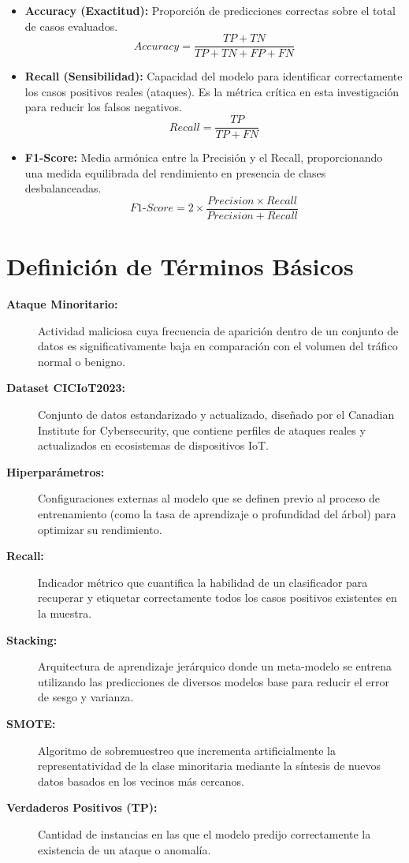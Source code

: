 \begin{itemize}
    \item \textbf{Accuracy (Exactitud):} Proporción de predicciones correctas sobre el total de casos evaluados.
    \begin{equation}
    Accuracy = \frac{TP + TN}{TP + TN + FP + FN}
    \end{equation}

    \item \textbf{Recall (Sensibilidad):} Capacidad del modelo para identificar correctamente los casos positivos reales (ataques). Es la métrica crítica en esta investigación para reducir los falsos negativos.
    \begin{equation}
    Recall = \frac{TP}{TP + FN}
    \end{equation}

    \item \textbf{F1-Score:} Media armónica entre la Precisión y el Recall, proporcionando una medida equilibrada del rendimiento en presencia de clases desbalanceadas.
    \begin{equation}
    F1\text{-}Score = 2 \times \frac{Precision \times Recall}{Precision + Recall}
    \end{equation}
\end{itemize}

\section{Definición de Términos Básicos}

\begin{description}
    \item[\textbf{Ataque Minoritario:}] Actividad maliciosa cuya frecuencia de aparición dentro de un conjunto de datos es significativamente baja en comparación con el volumen del tráfico normal o benigno.
    \item[\textbf{Dataset CICIoT2023:}] Conjunto de datos estandarizado y actualizado, diseñado por el Canadian Institute for Cybersecurity, que contiene perfiles de ataques reales y actualizados en ecosistemas de dispositivos IoT.
    \item[\textbf{Hiperparámetros:}] Configuraciones externas al modelo que se definen previo al proceso de entrenamiento (como la tasa de aprendizaje o profundidad del árbol) para optimizar su rendimiento.
    \item[\textbf{Recall:}] Indicador métrico que cuantifica la habilidad de un clasificador para recuperar y etiquetar correctamente todos los casos positivos existentes en la muestra.
    \item[\textbf{Stacking:}] Arquitectura de aprendizaje jerárquico donde un meta-modelo se entrena utilizando las predicciones de diversos modelos base para reducir el error de sesgo y varianza.
    \item[\textbf{SMOTE:}] Algoritmo de sobremuestreo que incrementa artificialmente la representatividad de la clase minoritaria mediante la síntesis de nuevos datos basados en los vecinos más cercanos.
    \item[\textbf{Verdaderos Positivos (TP):}] Cantidad de instancias en las que el modelo predijo correctamente la existencia de un ataque o anomalía.
\end{description}